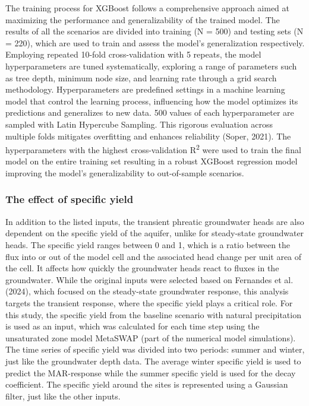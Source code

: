 \documentclass[
]{agujournal2019}
\begin{document}
The training process for XGBoost follows a comprehensive approach aimed
at maximizing the performance and generalizability of the trained model.
The results of all the scenarios are divided into training (N = 500) and
testing sets (N = 220), which are used to train and assess the model's
generalization respectively. Employing repeated 10-fold cross-validation
with 5 repeats, the model hyperparameters are tuned systematically,
exploring a range of parameters such as tree depth, minimum node size,
and learning rate through a grid search methodology. Hyperparameters are
predefined settings in a machine learning model that control the
learning process, influencing how the model optimizes its predictions
and generalizes to new data. 500 values of each hyperparameter are
sampled with Latin Hypercube Sampling. This rigorous evaluation across
multiple folds mitigates overfitting and enhances reliability (Soper,
2021). The hyperparameters with the highest cross-validation
R\textsuperscript{2} were used to train the final model on the entire
training set resulting in a robust XGBoost regression model improving
the model's generalizability to out-of-sample scenarios.

\subsubsection{The effect of specific yield}\label{sec-methods-SY}

In addition to the listed inputs, the transient phreatic groundwater
heads are also dependent on the specific yield of the aquifer, unlike
for steady-state groundwater heads. The specific yield ranges between 0
and 1, which is a ratio between the flux into or out of the model cell
and the associated head change per unit area of the cell. It affects how
quickly the groundwater heads react to fluxes in the groundwater. While
the original inputs were selected based on Fernandes et al. (2024),
which focused on the steady-state groundwater response, this analysis
targets the transient response, where the specific yield plays a
critical role. For this study, the specific yield from the baseline
scenario with natural precipitation is used as an input, which was
calculated for each time step using the unsaturated zone model MetaSWAP
(part of the numerical model simulations). The time series of specific
yield was divided into two periods: summer and winter, just like the
groundwater depth data. The average winter specific yield is used to
predict the MAR-response while the summer specific yield is used for the
decay coefficient. The specific yield around the sites is represented
using a Gaussian filter, just like the other inputs.
\end{document}
